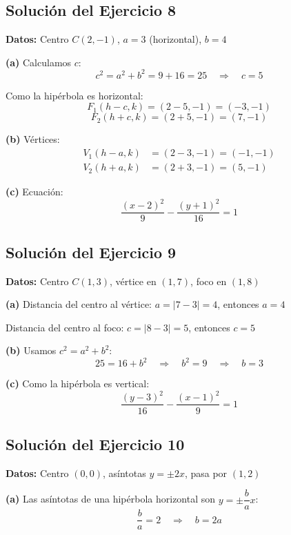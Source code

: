 \documentclass[12pt,a4paper]{article}
\begin{document}
	\subsection*{Solución del Ejercicio 8}

	\textbf{Datos:} Centro $C(2,-1)$, $a=3$ (horizontal), $b=4$

	\bigskip

	\textbf{(a)} Calculamos $c$:
	\[
	c^2=a^2+b^2=9+16=25 \quad\Rightarrow\quad c=5
	\]

	Como la hipérbola es horizontal:
	\[
	F_1(h-c,k)=(2-5,-1)=(-3,-1)
	\]
	\[
	F_2(h+c,k)=(2+5,-1)=(7,-1)
	\]


	\textbf{(b)} Vértices:
	\[
	\begin{aligned}
		V_1(h-a,k)&=(2-3,-1)=(-1,-1)\\
		V_2(h+a,k)&=(2+3,-1)=(5,-1)
	\end{aligned}
	\]


	\textbf{(c)} Ecuación:
	\[
	\boxed{\frac{(x-2)^2}{9}-\frac{(y+1)^2}{16}=1}
	\]

	\subsection*{Solución del Ejercicio 9}

	\textbf{Datos:} Centro $C(1,3)$, vértice en $(1,7)$, foco en $(1,8)$

	\bigskip

	\textbf{(a)} Distancia del centro al vértice: $a=|7-3|=4$, entonces $\boxed{a=4}$

	Distancia del centro al foco: $c=|8-3|=5$, entonces $\boxed{c=5}$

	\textbf{(b)} Usamos $c^2=a^2+b^2$:
	\[
	25=16+b^2 \quad\Rightarrow\quad b^2=9 \quad\Rightarrow\quad \boxed{b=3}
	\]

	\textbf{(c)} Como la hipérbola es vertical:
	\[
	\boxed{\frac{(y-3)^2}{16}-\frac{(x-1)^2}{9}=1}
	\]

	\subsection*{Solución del Ejercicio 10}

	\textbf{Datos:} Centro $(0,0)$, asíntotas $y=\pm 2x$, pasa por $(1,2)$

	\bigskip

	\textbf{(a)} Las asíntotas de una hipérbola horizontal son $y=\pm\dfrac{b}{a}x$:
	\[
	\frac{b}{a}=2 \quad\Rightarrow\quad \boxed{b=2a}
	\]
\end{document}
